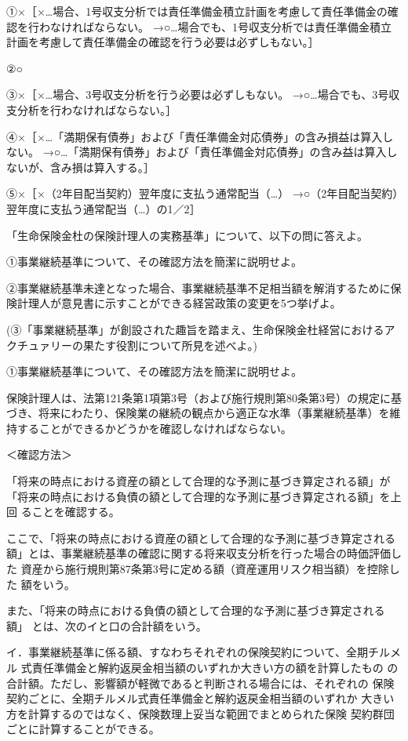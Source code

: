 \documentclass[report,gutter=10mm,fore-edge=10mm,uplatex,dvipdfmx]{jlreq}
\begin{document}
\answer{}
①×［×…場合、1号収支分析では責任準備金積立計画を考慮して責任準備金の確認を行わなければならない。
→○…場合でも、1号収支分析では責任準備金積立計画を考慮して責任準備金の確認を行う必要は必ずしもない。］

②○

③×［×…場合、3号収支分析を行う必要は必ずしもない。
→○…場合でも、3号収支分析を行わなければならない。］

④×［×…「満期保有債券」および「責任準備金対応債券」の含み損益は算入しない。
→○…「満期保有債券」および「責任準備金対応債券」の含み益は算入しないが、含み損は算入する。］

⑤×［×（2年目配当契約）翌年度に支払う通常配当（…）
→○（2年目配当契約）翌年度に支払う通常配当（…）の1／2］

「生命保険金杜の保険計理人の実務基準」について、以下の問に答えよ。

①事業継続基準について、その確認方法を簡潔に説明せよ。

②事業継続基準未達となった場合、事業継続基準不足相当額を解消するために保険計理人が意見書に示すことができる経営政策の変更を5つ挙げよ。

(③「事業継続基準」が創設された趣旨を踏まえ、生命保険金杜経営におけるアクチュァリーの果たす役割について所見を述べよ。)

\answer{}
①事業継続基準について、その確認方法を簡潔に説明せよ。

保険計理人は、法第121条第1項第3号（および施行規則第80条第3号）の規定に基づき、将来にわたり、保険業の継続の観点から適正な水準（事業継続基準）を維持することができるかどうかを確認しなければならない。

＜確認方法＞

「将来の時点における資産の額として合理的な予測に基づき算定される額」が
「将来の時点における負債の額として合理的な予測に基づき算定される額」を上回
ることを確認する。

ここで、「将来の時点における資産の額として合理的な予測に基づき算定される
額」とは、事業継続基準の確認に関する将来収支分析を行った場合の時価評価した
資産から施行規則第87条第3号に定める額（資産運用リスク相当額）を控除した
額をいう。

また、「将来の時点における負債の額として合理的な予測に基づき算定される額」
とは、次のイと口の合計額をいう。

イ．事業継続基準に係る額、すなわちそれぞれの保険契約について、全期チルメル
式責任準備金と解約返戻金相当額のいずれか大きい方の額を計算したもの
の合計額。ただし、影響額が軽微であると判断される場合には、それぞれの
保険契約ごとに、全期チルメル式責任準備金と解約返戻金相当額のいずれか
大きい方を計算するのではなく、保険数理上妥当な範囲でまとめられた保険
契約群団ごとに計算することができる。
\end{document}
